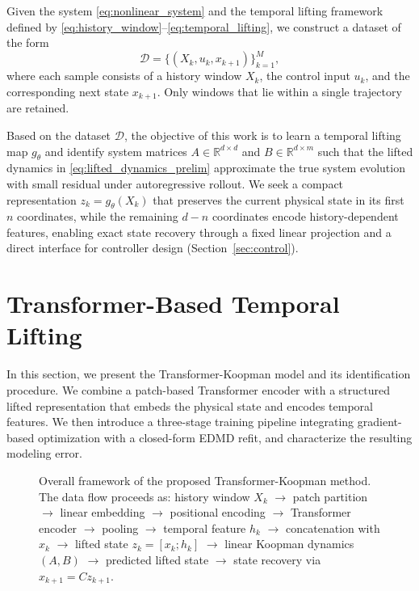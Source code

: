 \documentclass[journal]{IEEEtran}
\begin{document}
Given the system \eqref{eq:nonlinear_system} and the temporal lifting framework defined by \eqref{eq:history_window}--\eqref{eq:temporal_lifting}, we construct a dataset of the form
\begin{equation}
    \mathcal{D} = \{(X_k, u_k, x_{k+1})\}_{k=1}^{M},
    \label{eq:dataset}
\end{equation}
where each sample consists of a history window $X_k$, the control input $u_k$, and the corresponding next state $x_{k+1}$. Only windows that lie within a single trajectory are retained.

Based on the dataset $\mathcal{D}$, the objective of this work is to learn a temporal lifting map $g_\theta$ and identify system matrices $A \in \mathbb{R}^{d\times d}$ and $B \in \mathbb{R}^{d\times m}$ such that the lifted dynamics in \eqref{eq:lifted_dynamics_prelim} approximate the true system evolution with small residual under autoregressive rollout. We seek a compact representation $z_k = g_\theta(X_k)$ that preserves the current physical state in its first $n$ coordinates, while the remaining $d-n$ coordinates encode history-dependent features, enabling exact state recovery through a fixed linear projection and a direct interface for controller design (Section~\ref{sec:control}).

\section{Transformer-Based Temporal Lifting}
\label{sec:methodology}

In this section, we present the Transformer-Koopman model and its identification procedure. We combine a patch-based Transformer encoder with a structured lifted representation that embeds the physical state and encodes temporal features. We then introduce a three-stage training pipeline integrating gradient-based optimization with a closed-form EDMD refit, and characterize the resulting modeling error.

\begin{figure}[!t]
    \centering
    \caption{Overall framework of the proposed Transformer-Koopman method. The data flow proceeds as: history window $X_k$ $\rightarrow$ patch partition $\rightarrow$ linear embedding $\rightarrow$ positional encoding $\rightarrow$ Transformer encoder $\rightarrow$ pooling $\rightarrow$ temporal feature $h_k$ $\rightarrow$ concatenation with $x_k$ $\rightarrow$ lifted state $z_k=[x_k;h_k]$ $\rightarrow$ linear Koopman dynamics $(A,B)$ $\rightarrow$ predicted lifted state $\rightarrow$ state recovery via $x_{k+1}=Cz_{k+1}$.}
    \label{fig:framework}
\end{figure}
\end{document}
